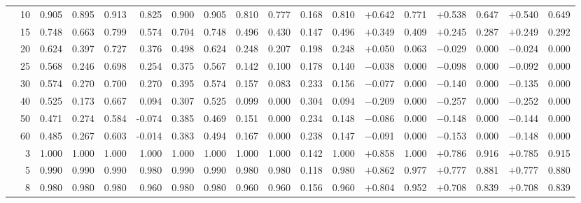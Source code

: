 \begin{table}[ht]
{\begin{tabular}{p{2.2cm}r rrrr rr rr rr rr rr rr}
  & 10 & 0.905 & 0.895 & 0.913 & 0.825 & 0.900 & 0.905 & 0.810 & 0.777 & 0.168 & 0.810 & $+$0.642 & 0.771 & $+$0.538 & 0.647 & $+$0.540 & 0.649 \\
  & 15 & 0.748 & 0.663 & 0.799 & 0.574 & 0.704 & 0.748 & 0.496 & 0.430 & 0.147 & 0.496 & $+$0.349 & 0.409 & $+$0.245 & 0.287 & $+$0.249 & 0.292 \\
  & 20 & 0.624 & 0.397 & 0.727 & 0.376 & 0.498 & 0.624 & 0.248 & 0.207 & 0.198 & 0.248 & $+$0.050 & 0.063 & $-$0.029 & 0.000 & $-$0.024 & 0.000 \\
  & 25 & 0.568 & 0.246 & 0.698 & 0.254 & 0.375 & 0.567 & 0.142 & 0.100 & 0.178 & 0.140 & $-$0.038 & 0.000 & $-$0.098 & 0.000 & $-$0.092 & 0.000 \\
  & 30 & 0.574 & 0.270 & 0.700 & 0.270 & 0.395 & 0.574 & 0.157 & 0.083 & 0.233 & 0.156 & $-$0.077 & 0.000 & $-$0.140 & 0.000 & $-$0.135 & 0.000 \\
  & 40 & 0.525 & 0.173 & 0.667 & 0.094 & 0.307 & 0.525 & 0.099 & 0.000 & 0.304 & 0.094 & $-$0.209 & 0.000 & $-$0.257 & 0.000 & $-$0.252 & 0.000 \\
  & 50 & 0.471 & 0.274 & 0.584 & -0.074 & 0.385 & 0.469 & 0.151 & 0.000 & 0.234 & 0.148 & $-$0.086 & 0.000 & $-$0.148 & 0.000 & $-$0.144 & 0.000 \\
  & 60 & 0.485 & 0.267 & 0.603 & -0.014 & 0.383 & 0.494 & 0.167 & 0.000 & 0.238 & 0.147 & $-$0.091 & 0.000 & $-$0.153 & 0.000 & $-$0.148 & 0.000 \\
\midrule
{}
  & 3  & 1.000 & 1.000 & 1.000 & 1.000 & 1.000 & 1.000 & 1.000 & 1.000 & 0.142 & 1.000 & $+$0.858 & 1.000 & $+$0.786 & 0.916 & $+$0.785 & 0.915 \\
  & 5  & 0.990 & 0.990 & 0.990 & 0.980 & 0.990 & 0.990 & 0.980 & 0.980 & 0.118 & 0.980 & $+$0.862 & 0.977 & $+$0.777 & 0.881 & $+$0.777 & 0.880 \\
  & 8  & 0.980 & 0.980 & 0.980 & 0.960 & 0.980 & 0.980 & 0.960 & 0.960 & 0.156 & 0.960 & $+$0.804 & 0.952 & $+$0.708 & 0.839 & $+$0.708 & 0.839 \\

\end{tabular}}
\end{table}
